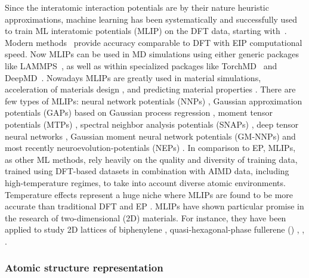 Since the interatomic interaction potentials are by their nature heuristic approximations, machine learning has been systematically and successfully used to train ML interatomic potentials (MLIP) on the DFT data, starting with~\cite{behler2007generalized}. Modern methods~\cite{mortazavi2023atomistic, anstine2023machine, wen2022deep} provide accuracy comparable to DFT with EIP computational speed. Now MLIPs can be used in MD simulations using either generic packages like LAMMPS~\cite{LAMMPS}, as well as within specialized packages like TorchMD~\cite{doerr2020torchmd} and DeepMD~\cite{wang2018deepmd}. Nowadays MLIPs are greatly used in material simulations, acceleration of materials design \cite{gubaev2019accelerating,podryabinkin2019accelerating, lu202186}, and predicting material properties \cite{mortazavi2020exploring}. There are few types of MLIPs: neural network potentials (NNPs) \cite{behler2007generalized,chen2022universal,wen2022deep}, Gaussian approximation potentials (GAPs) based on Gaussian process regression \cite{bartok2010gaussian}, moment tensor potentials (MTPs) \cite{novikov2020mlip,shapeev2016moment}, spectral neighbor analysis potentials (SNAPs) \cite{thompson2015spectral}, deep tensor neural networks \cite{schutt2017quantum}, Gaussian moment neural network potentials (GM-NNPs) \cite{zaverkin2020gaussian} and most recently neuroevolution-potentials (NEPs) \cite{fan2021neuroevolution}. In comparison to EP, MLIPs, as other ML methods, rely heavily on the quality and diversity of training data, trained using DFT-based datasets in combination with AIMD data, including high-temperature regimes, to take into account diverse atomic environments. Temperature effects represent a huge niche where MLIPs are found to be more accurate than traditional DFT and EP \cite{mortazavi2023atomistic}. MLIPs have shown particular promise in the research of two-dimensional (2D) materials. For instance, they have been applied to study 2D lattices of biphenylene \cite{fan2021biphenylene}, quasi-hexagonal-phase  fullerene () \cite{hou2022synthesis},  \cite{seo2021dominant},  \cite{marmolejo2022thermal}.

\subsubsection{Atomic structure representation}
\label{subsec:Atomic}

